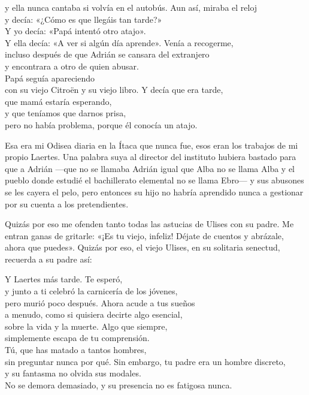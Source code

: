 \begin{versopropio}
y ella nunca cantaba si volvía en el autobús.
\stanzabreak
Aun así, miraba el reloj\\
y decía: «¿Cómo es que llegáis tan tarde?»\\
Y yo decía: «Papá intentó otro atajo».\\
Y ella decía: «A ver si algún día aprende».
\stanzabreak
Venía a recogerme,\\
incluso después de que Adrián se cansara del extranjero\\
y encontrara a otro de quien abusar.\\
Papá seguía apareciendo\\
con su viejo Citroën y su viejo libro.
\stanzabreak
Y decía que era tarde,\\
que mamá estaría esperando,\\
y que teníamos que darnos prisa,\\
pero no había problema, porque él conocía un atajo.
\end{versopropio}

Esa era mi Odisea diaria en la Ítaca que nunca fue, esos eran los trabajos de mi propio Laertes. Una palabra suya al director del instituto hubiera bastado para que a Adrián ---que no se llamaba Adrián igual que Alba no se llama Alba y el pueblo donde estudié el bachillerato elemental no se llama Ebro--- y sus abusones se les cayera el pelo, pero entonces su hijo no habría aprendido nunca a gestionar por su cuenta a los pretendientes.

Quizás por eso me ofenden tanto todas las astucias de Ulises con su padre. Me entran ganas de gritarle: «¡Es tu viejo, infeliz! Déjate de cuentos y abrázale, ahora que puedes». Quizás por eso, el viejo Ulises, en su solitaria senectud, recuerda a su padre así:

\begin{versopropio}
Y Laertes más tarde. Te esperó,\\
y junto a ti celebró la carnicería de los jóvenes,\\
pero murió poco después. Ahora acude a tus sueños\\
a menudo, como si quisiera decirte algo esencial,\\
sobre la vida y la muerte. Algo que siempre,\\
simplemente escapa de tu comprensión.\\
Tú, que has matado a tantos hombres,\\
sin preguntar nunca por qué.
\stanzabreak
Sin embargo, tu padre era un hombre discreto,\\
y su fantasma no olvida sus modales.\\
No se demora demasiado, y su presencia no es fatigosa nunca.
\end{versopropio}

